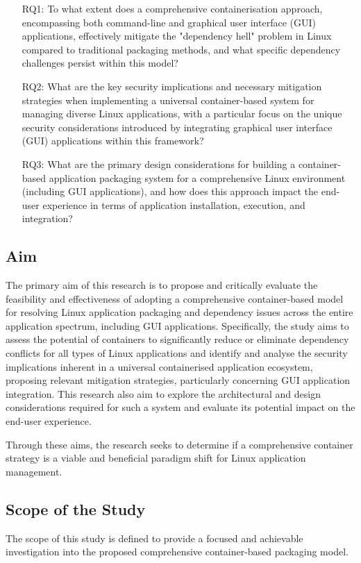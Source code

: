 \documentclass[journal,onecolumn]{IEEEtran}
\begin{document}
\begin{itemize}[]
    \item[RQ1:] To what extent does a comprehensive containerisation approach, encompassing both command-line and graphical user interface (GUI) applications, effectively mitigate the "dependency hell" problem in Linux compared to traditional packaging methods, and what specific dependency challenges persist within this model?
    \item[RQ2:] What are the key security implications and necessary mitigation strategies when implementing a universal container-based system for managing diverse Linux applications, with a particular focus on the unique security considerations introduced by integrating graphical user interface (GUI) applications within this framework?
    \item[RQ3:] What are the primary design considerations for building a container-based application packaging system for a comprehensive Linux environment (including GUI applications), and how does this approach impact the end-user experience in terms of application installation, execution, and integration? 
\end{itemize}


\subsection{Aim}
The primary aim of this research is to propose and critically evaluate the feasibility and effectiveness of adopting a comprehensive container-based model for resolving Linux application packaging and dependency issues across the entire application spectrum, including GUI applications. Specifically, the study aims to assess the potential of containers to significantly reduce or eliminate dependency conflicts for all types of Linux applications and identify and analyse the security implications inherent in a universal containerised application ecosystem, proposing relevant mitigation strategies, particularly concerning GUI application integration. This research also aim to explore the architectural and design considerations required for such a system and evaluate its potential impact on the end-user experience. 

Through these aims, the research seeks to determine if a comprehensive container strategy is a viable and beneficial paradigm shift for Linux application management. 

\subsection{Scope of the Study}
The scope of this study is defined to provide a focused and achievable investigation into the proposed comprehensive container-based packaging model. 
\end{document}
